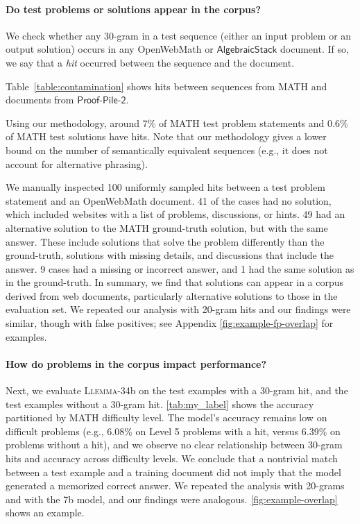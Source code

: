 \paragraph{Do test problems or solutions appear in the corpus?}

We check whether any 30-gram in a test sequence (either an input problem or an output solution) occurs in any OpenWebMath or $\mathsf{AlgebraicStack}$ document. If so, we say that a \textit{hit} occurred between the sequence and the document. 

Table~\ref{table:contamination} shows hits between sequences from MATH and documents from $\mathsf{Proof}$-$\mathsf{Pile}$-$\mathsf{2}$.

Using our methodology, around 7\% of MATH test problem statements and 0.6\% of MATH test solutions have hits. Note that our methodology gives a lower bound on the number of semantically equivalent sequences (e.g., it does not account for alternative phrasing).

We manually inspected 100 uniformly sampled hits between a test problem statement and an OpenWebMath document. 41 of the cases had no solution, which included websites with a list of problems, discussions, or hints. 49 had an alternative solution to the MATH ground-truth solution, but with the same answer. These include solutions that solve the problem differently than the ground-truth, solutions with missing details, and discussions that include the answer. 9 cases had a missing or incorrect answer, and 1 had the same solution as in the ground-truth. In summary, we find that solutions can appear in a corpus derived from web documents, particularly alternative solutions to those in the evaluation set. We repeated our analysis with 20-gram hits and our findings were similar, though with  false positives; see Appendix \autoref{fig:example-fp-overlap} for examples.

\paragraph{How do problems in the corpus impact performance?} Next, we evaluate \textsc{Llemma}-34b on the test examples with a 30-gram hit, and the test examples without a 30-gram hit.
\autoref{tab:my_label} shows the accuracy partitioned by MATH difficulty level. The model's accuracy remains low on difficult problems (e.g., 6.08\% on Level 5 problems with a hit, versus 6.39\% on problems without a hit), and we observe no clear relationship between 30-gram hits and accuracy across difficulty levels. We conclude that a nontrivial match between a test example and a training document did not imply that the model generated a memorized correct answer. We repeated the analysis with 20-grams and with the 7b model, and our findings were analogous.
\autoref{fig:example-overlap} shows an example.

